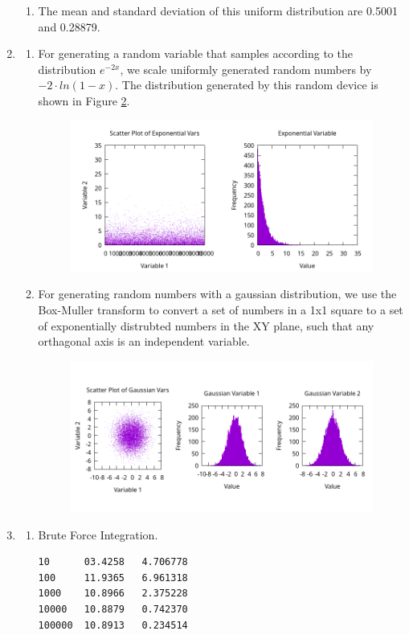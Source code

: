 \documentclass[11 pt]{article}
\begin{document}
\begin{enumerate}
\begin{enumerate}
\item The mean and standard deviation of this uniform distribution are 0.5001 and 0.28879.
\end{enumerate}
\item
\begin{enumerate}
\item For generating a random variable that samples according to the distribution $e^{-2x}$, we scale uniformly generated random numbers by $-2\cdot ln(1-x)$. The distribution generated by this random device is shown in Figure \ref{fig4}.
\begin{figure}[h]
\begin{center}
\label{fig4}
\includegraphics[width=5in]{"plots/q3_a_exponential.png"}
\end{center}
\end{figure}
\item For generating random numbers with a gaussian distribution, we use the Box-Muller transform to convert a set of numbers in a 1x1 square to a set of exponentially distrubted numbers in the XY plane, such that any orthagonal axis is an independent variable.
\begin{figure}[h]
\begin{center}
\label{fig4}
\includegraphics[width=5in]{"plots/q3_b_gaussians.png"}
\end{center}
\end{figure}
\end{enumerate}
\item
\begin{enumerate}
\item Brute Force Integration.
\begin{verbatim}
10      03.4258   4.706778
100     11.9365   6.961318
1000    10.8966   2.375228
10000   10.8879   0.742370
100000  10.8913   0.234514
\end{verbatim}
\end{enumerate}
\end{enumerate}
\end{document}
